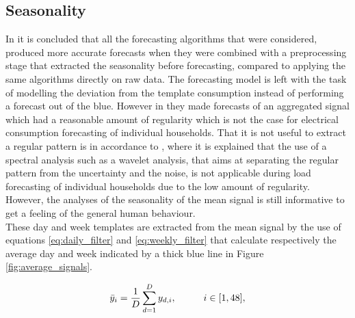  
\subsection{Seasonality}
In \cite{Hoverstad2015} it is concluded that all the forecasting algorithms that were considered, produced more accurate forecasts when they were combined with a preprocessing stage that extracted the seasonality before forecasting, compared to applying the same algorithms directly on raw data. The forecasting model is left with the task of modelling the deviation from the template consumption instead of performing a forecast out of the blue. However in \cite{Hoverstad2015} they made forecasts of an aggregated signal which had a reasonable amount of regularity which is not the case for electrical consumption forecasting of individual households. That it is not useful to extract a regular pattern is in accordance to \cite{Shi2018}, where it is explained that the use of a spectral analysis such as a wavelet analysis, that aims at separating the regular pattern from the uncertainty and the noise, is not applicable during load forecasting of individual households due to the low amount of regularity. However, the analyses of the seasonality of the mean signal is still informative to get a feeling of the general human behaviour.\\

These day and week templates are extracted from the mean signal by the use of equations \ref{eq:daily_filter} and \ref{eq:weekly_filter} that calculate respectively the average day and week indicated by a thick blue line in Figure \ref{fig:average_signals}.

\begin{equation}\label{eq:daily_filter}
	\bar{y}_i = \frac{1}{D} \sum_{d=1}^D y_{d,i}, \hspace{10mm} i \in [1,48],
\end{equation} 

